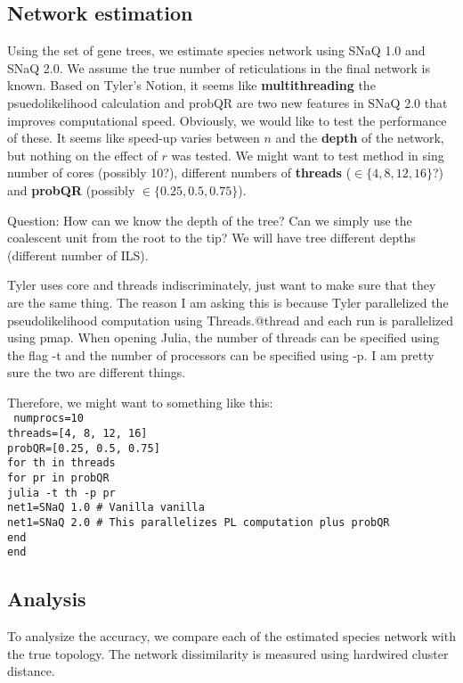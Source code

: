 \documentclass{article}
\newcommand{\kevin}{\color{blue}}
\begin{document}
\subsection{Network estimation}
Using the set of gene trees, we estimate species network using SNaQ 1.0 and SNaQ 2.0. We assume the true number of reticulations in the final network is known. Based on Tyler's Notion, it seems like \textbf{multithreading} the psuedolikelihood calculation and probQR are two new features in SNaQ 2.0 that improves computational speed. Obviously, we would like to test the performance of these. It seems like speed-up varies between $n$ and the \textbf{depth} of the network, but nothing on the effect of $r$ was tested. We might want to test method in sing number of cores (possibly 10?), different numbers of \textbf{threads} ($\in \{4, 8, 12, 16\}$?) and \textbf{probQR} (possibly $\in \{0.25, 0.5, 0.75\}$). 

{\kevin Question: How can we know the depth of the tree? Can we simply use the coalescent unit from the root to the tip? We will have tree different depths (different number of ILS).}

{\kevin Tyler uses core and threads indiscriminately, just want to make sure that they are the same thing. The reason I am asking this is because Tyler parallelized the pseudolikelihood computation using Threads.@thread and each run is parallelized using pmap. When opening Julia, the number of threads can be specified using the flag -t and the number of processors can be specified using -p. I am pretty sure the two are different things.

Therefore, we might want to something like this:\\
\texttt{
numprocs=10\\
threads=[4, 8, 12, 16]\\
probQR=[0.25, 0.5, 0.75]\\
for th in threads\\
	for pr in probQR\\
		julia -t th -p pr\\
		net1=SNaQ 1.0 \# Vanilla vanilla \\ 
		net1=SNaQ 2.0 \# This parallelizes PL computation plus probQR\\
		end\\
		end	\\	
}
}





\subsection{Analysis}
To analysize the accuracy, we compare each of the estimated species network with the true topology. The network dissimilarity is measured using hardwired cluster distance. 
\end{document}
